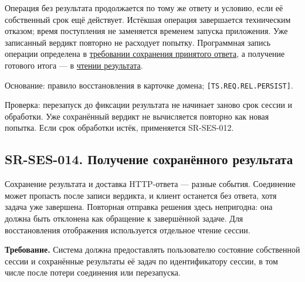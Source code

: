 \documentclass[12pt,a4paper]{article}
\begin{document}
Операция без результата продолжается по тому же ответу и условию, если её собственный срок ещё действует. Истёкшая операция завершается техническим отказом; время поступления не заменяется временем запуска приложения. Уже записанный вердикт повторно не расходует попытку. Программная запись операции определена в \href{../07_\%D0\%9F\%D1\%80\%D0\%BE\%D0\%B3\%D1\%80\%D0\%B0\%D0\%BC\%D0\%BC\%D0\%BD\%D1\%8B\%D0\%B5_\%D1\%82\%D1\%80\%D0\%B5\%D0\%B1\%D0\%BE\%D0\%B2\%D0\%B0\%D0\%BD\%D0\%B8\%D1\%8F/DOC-06.2_\%D0\%A1\%D0\%B5\%D1\%81\%D1\%81\%D0\%B8\%D0\%B8_\%D0\%B7\%D0\%B0\%D0\%B4\%D0\%B0\%D1\%87_\%D0\%B8_\%D0\%BF\%D0\%BB\%D0\%B0\%D0\%BD\%D0\%B8\%D1\%80\%D0\%BE\%D0\%B2\%D1\%89\%D0\%B8\%D0\%BA.pdf\#nameddest=swr-ses-021-\%D0\%B7\%D0\%B0\%D0\%BF\%D0\%B8\%D1\%81\%D1\%8C-\%D0\%BF\%D1\%80\%D0\%B8\%D0\%BD\%D1\%8F\%D1\%82\%D0\%BE\%D0\%B9-\%D0\%BE\%D0\%BF\%D0\%B5\%D1\%80\%D0\%B0\%D1\%86\%D0\%B8\%D0\%B8}{требовании сохранения принятого ответа}, а получение готового итога --- в \hyperref[sr-ses-014-ux43fux43eux43bux443ux447ux435ux43dux438ux435-ux441ux43eux445ux440ux430ux43dux451ux43dux43dux43eux433ux43e-ux440ux435ux437ux443ux43bux44cux442ux430ux442ux430]{чтении результата}.

Основание: правило восстановления в карточке домена; \texttt{[TS.\allowbreak{}REQ.\allowbreak{}REL.\allowbreak{}PERSIST]}.

Проверка: перезапуск до фиксации результата не начинает заново срок сессии и обработки. Уже сохранённый вердикт не вычисляется повторно как новая попытка. Если срок обработки истёк, применяется SR-SES-012.

\subsection{SR-SES-014. Получение сохранённого результата}\label{sr-ses-014-ux43fux43eux43bux443ux447ux435ux43dux438ux435-ux441ux43eux445ux440ux430ux43dux451ux43dux43dux43eux433ux43e-ux440ux435ux437ux443ux43bux44cux442ux430ux442ux430}

\hypertarget{sr-ses-014-получение-сохранённого-результата}{}

Сохранение результата и доставка HTTP-ответа --- разные события. Соединение может пропасть после записи вердикта, и клиент останется без ответа, хотя задача уже завершена. Повторная отправка решения здесь непригодна: она должна быть отклонена как обращение к завершённой задаче. Для восстановления отображения используется отдельное чтение сессии.

\textbf{Требование.} Система должна предоставлять пользователю состояние собственной сессии и сохранённые результаты её задач по идентификатору сессии, в том числе после потери соединения или перезапуска.
\end{document}
